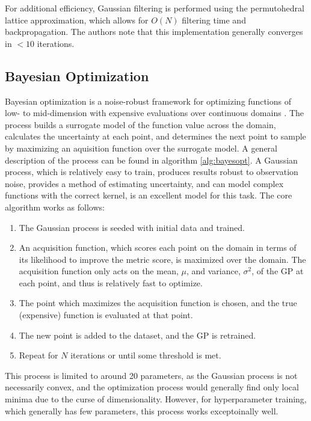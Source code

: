 \documentclass[10pt,twocolumn,letterpaper]{article}
\begin{document}
For additional efficiency, Gaussian filtering is performed using the permutohedral lattice approximation, which allows for $O(N)$ filtering time and backpropagation. The authors note that this implementation generally converges in $<10$ iterations.

\subsection{Bayesian Optimization}

Bayesian optimization is a noise-robust framework for optimizing functions of low- to mid-dimension with expensive evaluations over continuous domains \cite{frazier2018tutorial}. The process builds a surrogate model of the 
function value across the domain, calculates the uncertainty at each point, and determines the next point to sample by maximizing an aquisition function over the surrogate model. A general description 
of the process can be found in algorithm \ref{alg:bayesopt}. A Gaussian process, which is relatively easy to train, produces results robust to observation noise, provides a method of estimating uncertainty, and can model complex functions with the correct kernel, is an excellent model for this task. The core algorithm works as follows:

\begin{enumerate}
    \item The Gaussian process is seeded with initial data and trained.
    \item An acquisition function, which scores each point on the domain in terms of its likelihood to improve the metric score, is maximized over the domain. The acquisition function only
          acts on the mean, $\mu$, and variance, $\sigma^2$, of the GP at each point, and thus is relatively fast to optimize.
    \item The point which maximizes the acquisition function is chosen, and the true (expensive) function is evaluated at that point.
    \item The new point is added to the dataset, and the GP is retrained.
    \item Repeat for $N$ iterations or until some threshold is met.
\end{enumerate}

This process is limited to around 20 parameters, as the Gaussian process is not necessarily convex, and the optimization process would generally find only local minima due to the curse of dimensionality. However, for hyperparameter training, which generally has few parameters, this process works exceptoinally well.
\end{document}
